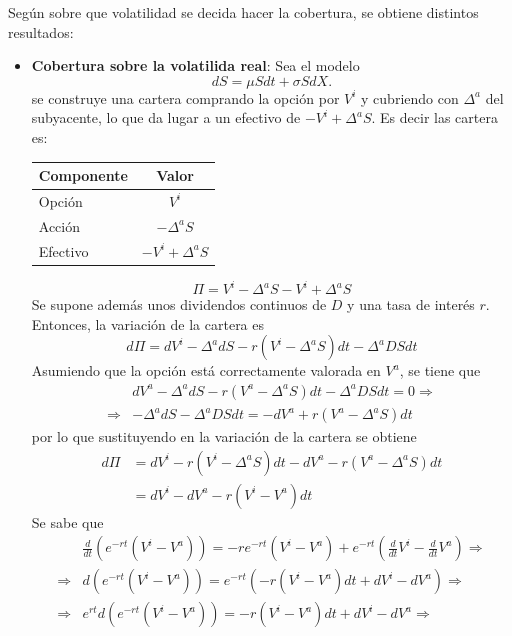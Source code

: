 Según sobre que volatilidad se decida hacer la cobertura, se obtiene distintos resultados:
\begin{itemize}
    \item \textbf{Cobertura sobre la volatilida real}: Sea el modelo
    \[
        dS = \mu S dt + \sigma S dX.
    \]
    se construye una cartera comprando la opción por $V^i$ y cubriendo con $\Delta^a$ del subyacente, lo que da lugar a un efectivo de $-V^i + \Delta^a S$. Es decir las cartera es:
    \begin{table}[H]
        \centering
        \begin{tabular}{l|c}
            \textbf{Componente} & \textbf{Valor} \\
            \hline
            Opción & $V^i$ \\
            Acción & $-\Delta^a S$ \\
            Efectivo & $-V^i + \Delta^a S$ \\
        \end{tabular}
    \end{table}
    \[
        \Pi = V^i-\Delta^a S-V^i + \Delta^a S
    \]
    Se supone además unos dividendos continuos de $D$ y una tasa de interés $r$. Entonces, la variación de la cartera es
    \[
        d\Pi = dV^i - \Delta^a dS - r(V^i - \Delta^a S)dt - \Delta^a D S dt
    \]
    Asumiendo que la opción está correctamente valorada en $V^a$, se tiene que
    \begin{align*}
        &dV^a - \Delta^a dS - r(V^a - \Delta^a S)dt - \Delta^a D S dt = 0 \Rightarrow \\
        \Rightarrow  &-\Delta^a dS - \Delta^a D S dt = -dV^a + r(V^a - \Delta^a S)dt
    \end{align*}
    por lo que sustituyendo en la variación de la cartera se obtiene
    \begin{align*}
        d\Pi &= dV^i - r(V^i - \Delta^a S)dt -dV^a - r(V^a - \Delta^a S)dt \\
        &= dV^i - dV^a - r(V^i - V^a)dt
    \end{align*}
    Se sabe que
    \begin{align*}
        &\frac{d}{dt} \left( e^{-rt}(V^i - V^a)\right) = -r e^{-rt}(V^i - V^a) + e^{-rt}\left(\frac{d}{dt}V^i - \frac{d}{dt}V^a\right) \Rightarrow \\
        \Rightarrow & d(e^{-rt}(V^i - V^a)) = e^{-rt}\left( -r(V^i - V^a)dt + dV^i - dV^a \right) \Rightarrow \\
        \Rightarrow & e^{rt}d(e^{-rt}(V^i - V^a)) = -r(V^i - V^a)dt + dV^i - dV^a \Rightarrow \\

\end{align*}
\end{itemize}
